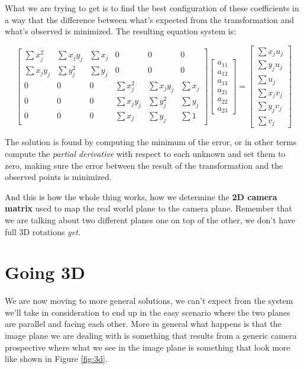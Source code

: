 What we are trying to get is to find the best configuration of these coefficients in a way that the difference between what's expected from the transformation and what's observed is minimized. The resulting equation system is:

\[
    \begin{bmatrix}
        \sum x^2_j & \sum x_jy_j & \sum x_j & 0 & 0 & 0 \\
        \sum x_jy_j & \sum y^2_j & \sum y_j & 0 & 0 & 0 \\
        0 & 0 & 0 & \sum x^2_j & \sum x_jy_j & \sum x_j \\
        0 & 0 & 0 & \sum x_jy_j & \sum y^2_j & \sum y_j \\
        0 & 0 & 0 & \sum x_j & \sum y_j & \sum 1 
    \end{bmatrix}
    \begin{bmatrix}
        a_{11} \\
        a_{12} \\
        a_{13} \\
        a_{21} \\
        a_{22} \\
        a_{23}
    \end{bmatrix}
    =
    \begin{bmatrix}
        \sum x_ju_j \\
        \sum y_ju_j \\
        \sum u_j \\
        \sum x_jv_j \\
        \sum y_jv_j \\
        \sum v_j
    \end{bmatrix}
\]

The solution is found by computing the minimum of the error, or in other terms compute the \textit{partial derivative} with respect to each unknown and set them to zero, making sure the error between the result of the transformation and the observed points is minimized.

And this is how the whole thing works, how we determine the \textbf{2D camera matrix} used to map the real world plane to the camera plane. Remember that we are talking about two different planes one on top of the other, we don't have full 3D rotations \textit{yet}.

\section{Going 3D}

We are now moving to more general solutions, we can't expect from the system we'll take in consideration to end up in the easy scenario where the two planes are parallel and facing each other.
More in general what happens is that the image plane we are dealing with is something that results from a generic camera prospective where what we see in the image plane is something that look more like shown in Figure \ref{fig:3d}.

